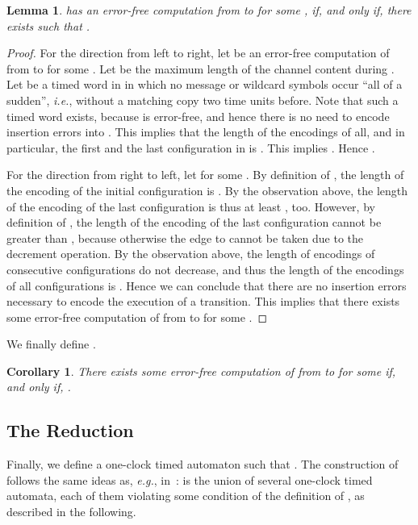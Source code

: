 \documentclass{CSML}
\theoremstyle{plain}\newtheorem{theorem}[thm]{Theorem}
\theoremstyle{plain}\newtheorem{corollary}[thm]{Corollary}
\theoremstyle{plain}\newtheorem{example}[thm]{Example}
\theoremstyle{plain}\newtheorem{lemma}[thm]{Lemma}
\theoremstyle{plain}\newtheorem{remark}[thm]{Remark}
\def\eg{{\em e.g.}}
\newcommand*\ie{\textit{i.e.}}
\begin{document}
\begin{lemma}
	\label{lemma_intersection}
	 has an error-free computation from  
	to  for some , if, and only if, 
	there exists   such that  .
\end{lemma}
\begin{proof}
	For the direction from left to right,
	let  be an error-free computation of  from  to  for some . 
	Let  be the maximum length of the channel content during . 
	Let  be a timed word in  in which no message or wildcard symbols occur ``all of a sudden'', \ie, without a matching copy two time units before. 
	Note that such a timed word exists, because  is error-free, and hence there is no need to encode insertion errors into . 
	This implies that the length of the encodings of all, and in particular, the first and the last configuration in  is . 
	This implies .
	Hence . 
	
	
	
	
	For the direction from right to left, 
	let  for some . 
By definition of , 
	the length of the encoding of the initial configuration is . 
	By the observation above, the length of the  encoding of the last configuration  is thus at least , too. 	
	However, by definition of , 
	the length of the encoding of the last configuration cannot be greater than , because otherwise the edge to  cannot be taken due to the decrement operation. 
	By the observation above, the length of encodings of consecutive configurations do not decrease, and thus the length of the encodings of all configurations is . Hence we can conclude that there are no insertion errors necessary to encode the execution of a transition. This implies that 
	there exists some error-free computation  of  from  to  for some . 	
\end{proof}
We finally define .
	\begin{corollary}
		\label{corollary_cap}
		There exists some error-free computation of  from  to  for some  if, and only if, . 
	\end{corollary}
	
	
	\subsection{The Reduction}
	Finally, 
	we define a one-clock timed automaton  such that . 
	The construction of  follows the same ideas as, \eg, in~\cite{DBLP:conf/formats/AdamsOW07}: 
	 is the union of several one-clock timed automata, each of them violating some condition of the definition of , as described in the following. 
	
\end{document}
